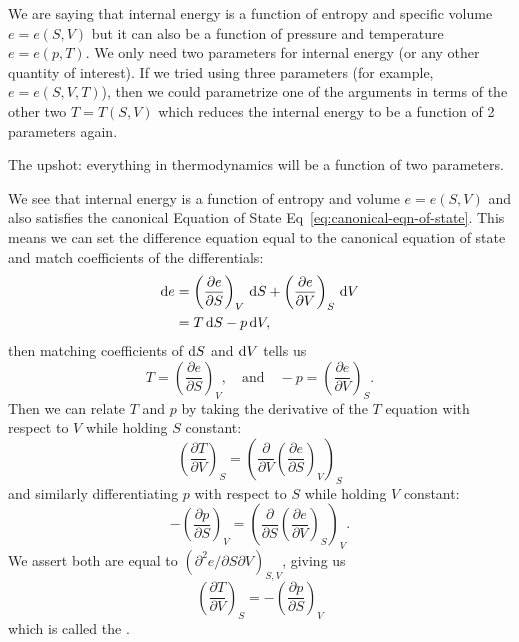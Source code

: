 \begin{node}
We are saying that internal energy is a function of entropy and
specific volume $e=e(S,V)$ but it can also be a function of pressure
and temperature $e=e(p,T)$. We only need two parameters for internal
energy (or any other quantity of interest). If we tried using three
parameters (for example, $e=e(S,V,T)$), then we could parametrize one
of the arguments in terms of the other two $T=T(S,V)$ which reduces
the internal energy to be a function of 2 parameters again.

The upshot: everything in thermodynamics will be a function of two parameters.
\end{node}

\begin{node}
We see that internal energy is a function of entropy and volume $e=e(S,V)$
and also satisfies the canonical Equation of State Eq~\eqref{eq:canonical-eqn-of-state}.
This means we can set the difference equation equal to the canonical
equation of state and match coefficients of the differentials:
\begin{subequations}
  \begin{align}
    \mathrm{d} e &= \left(\frac{\partial e}{\partial S}\right)_{V}\,\mathrm{d} S
    + \left(\frac{\partial e}{\partial V}\right)_{S}\,\mathrm{d} V\\
    &= T\,\mathrm{d} S - p\,\mathrm{d} V,
  \end{align}
\end{subequations}
then matching coefficients of $\mathrm{d} S$ and $\mathrm{d} V$ tells us
\begin{equation}
T = \left(\frac{\partial e}{\partial S}\right)_{V},\quad\mbox{and}\quad
-p = \left(\frac{\partial e}{\partial V}\right)_{S}.
\end{equation}
Then we can relate $T$ and $p$ by taking the derivative of the $T$
equation with respect to $V$ while holding $S$ constant:
\begin{equation}
\left(\frac{\partial T}{\partial V}\right)_{S}
=\left(\frac{\partial}{\partial V}\left(\frac{\partial e}{\partial S}\right)_{V}
\right)_{S}
\end{equation}
and similarly differentiating $p$ with respect to $S$ while holding
$V$ constant:
\begin{equation}
-\left(\frac{\partial p}{\partial S}\right)_{V}
=\left(\frac{\partial}{\partial S}\left(\frac{\partial e}{\partial V}\right)_{S}
\right)_{V}.
\end{equation}
We assert both are equal to $(\partial^{2}e/\partial S\partial V)_{S,V}$,
giving us
\begin{equation}
\boxed{\left(\frac{\partial T}{\partial V}\right)_{S}=-\left(\frac{\partial p}{\partial S}\right)_{V}}
\end{equation}
which is called the .
\end{node}

